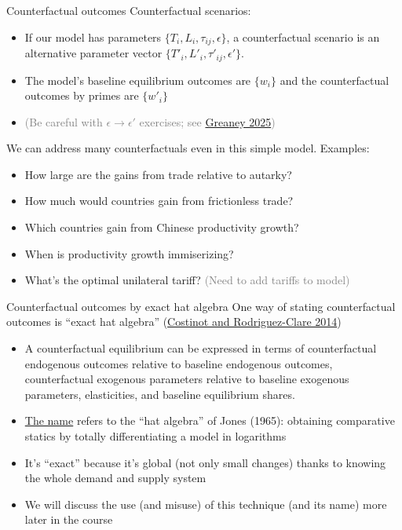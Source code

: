 \documentclass[10pt,notes=hide,aspectratio=169]{beamer}
\begin{document}
\begin{frame}{Counterfactual outcomes}
Counterfactual scenarios:
\begin{itemize}
\item If our model has parameters $\{T_i,L_i,\tau_{ij},\epsilon\}$,
a counterfactual scenario is an alternative parameter vector
$\{T'_i,L'_i,\tau'_{ij},\epsilon'\}$.
\item The model's baseline equilibrium outcomes are $\{w_{i}\}$
and the counterfactual outcomes by primes are $\{w'_{i}\}$
\item[] \textcolor{gray}{(Be careful with $\epsilon \to \epsilon'$ exercises; see \href{https://sites.google.com/view/briangreaney/research?authuser=0}{Greaney 2025})}
\end{itemize}
We can address many counterfactuals even in this simple model. Examples:
\begin{itemize}
\item How large are the gains from trade relative to autarky?
\item How much would countries gain from frictionless trade?
\item Which countries gain from Chinese productivity growth?
\item When is productivity growth immiserizing?
\item What's the optimal unilateral tariff? \textcolor{gray}{(Need to add tariffs to model)}
\end{itemize}
\end{frame}
\begin{frame}{Counterfactual outcomes by exact hat algebra}
One way of stating counterfactual outcomes is ``exact hat algebra''
(\href{https://doi.org/10.1016/B978-0-444-54314-1.00004-5}{Costinot and Rodriguez-Clare 2014})
\begin{itemize}
\item A counterfactual equilibrium can be expressed in terms of
counterfactual endogenous outcomes relative to baseline endogenous outcomes,
counterfactual exogenous parameters relative to baseline exogenous parameters,
elasticities,
and
baseline equilibrium shares.
\item \href{https://tradediversion.net/2018/05/07/on-hat-algebra/}{The name} refers to the ``hat algebra'' of Jones (1965):
obtaining comparative statics by totally differentiating a model in logarithms
\item It's ``exact'' because it's global (not only small changes) thanks to knowing the whole demand and supply system
\item We will discuss the use (and misuse) of this technique (and its name) more later in the course
\end{itemize}
\end{frame}
\end{document}
